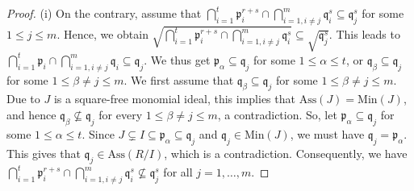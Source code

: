 \documentclass[11pt]{amsart}
\begin{document}
\begin{proof}
  (i) On the contrary, assume  that  $\bigcap_{i=1}^{t}{\mathfrak{p}^{r+s}_i}\cap  \bigcap_{i=1,i\neq j}^{m}{\mathfrak{q}^{s}_i} \subseteq   \mathfrak{q}_j^s$ 
  for some $1\leq j \leq m$. Hence, we obtain  $\sqrt{\bigcap_{i=1}^{t}{\mathfrak{p}^{r+s}_i}\cap  \bigcap_{i=1,i\neq j}^{m}{\mathfrak{q}^{s}_i}} \subseteq  \sqrt{\mathfrak{q}_j^s}$. This leads to  $\bigcap_{i=1}^{t}{\mathfrak{p}_i}\cap  \bigcap_{i=1,i\neq j}^{m}{\mathfrak{q}_i} \subseteq   \mathfrak{q}_j$. 
  We thus get $\mathfrak{p}_\alpha \subseteq \mathfrak{q}_j$ for some $1\leq \alpha \leq t$, or 
  $\mathfrak{q}_\beta \subseteq \mathfrak{q}_j$ for some $1\leq \beta\neq j \leq m$.   We first assume that 
  $\mathfrak{q}_\beta \subseteq \mathfrak{q}_j$ for some $1\leq \beta\neq j \leq m$. 
   Due to  $J$ is a  square-free monomial ideal, this implies that
     $\mathrm{Ass}(J)=\mathrm{Min}(J)$, and hence  $\mathfrak{q}_\beta \nsubseteq \mathfrak{q}_j$ for every  $1\leq \beta\neq j \leq m$, a contradiction. 
     So, let   $\mathfrak{p}_\alpha \subseteq \mathfrak{q}_j$ for some $1\leq \alpha \leq t$.
    Since $J\subsetneq I \subseteq\mathfrak{p}_\alpha \subseteq \mathfrak{q}_j$ and $\mathfrak{q}_j\in \mathrm{Min}(J)$, we must have
 $\mathfrak{q}_j=\mathfrak{p}_\alpha$. This gives that $\mathfrak{q}_j \in \mathrm{Ass}(R/I)$, which is a contradiction.  Consequently, we have 
    $\bigcap_{i=1}^{t}{\mathfrak{p}^{r+s}_i}\cap  \bigcap_{i=1,i\neq j}^{m}{\mathfrak{q}^{s}_i} \nsubseteq   \mathfrak{q}_j^s$ 
  for all $j=1, \ldots, m$. 
  

\end{proof}
\end{document}
